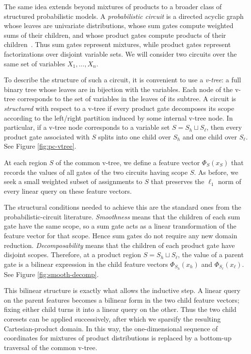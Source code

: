 \documentclass{article}
\begin{document}
The same idea extends beyond mixtures of products to a broader class of
structured probabilistic models.  A \emph{probabilistic circuit} is a
directed acyclic graph whose leaves are univariate distributions, whose
sum gates compute weighted sums of their children, and whose product
gates compute products of their children~\cite{ChoiVergariVanDenBroeck20,ZhangWangArenasVanDenBroeck25}.  
Thus sum gates represent
mixtures, while product gates represent factorizations over disjoint
variable sets.  We will consider two circuits over the same set of
variables $X_1,\ldots,X_n$.

To describe the structure of such a circuit, it is convenient to use a
\emph{v-tree}: a full binary tree whose leaves are in bijection with the
variables.  Each node of the v-tree corresponds to the set of variables
in the leaves of its subtree.  A circuit is \emph{structured} with
respect to a v-tree if every product gate decomposes its scope according
to the left/right partition induced by some internal v-tree node.  In
particular, if a v-tree node corresponds to a variable set
$S=S_h\sqcup S_\ell$, then every product gate associated with $S$
splits into one child over $S_h$ and one child over $S_\ell$. See Figure \ref{fig:pc-vtree}.

At each region $S$ of the common v-tree, we define a feature vector
$\Phi_S(x_S)$ that records the values of all gates of the two circuits
having scope $S$.  
As before, we seek a small weighted subset of
assignments to $S$ that preserves the $\ell_1$ norm of every linear
query on these feature vectors.

The structural conditions needed to achieve this are the standard ones from the probabilistic-circuit literature.  
\emph{Smoothness} means that the
children of each sum gate have the same scope, so a sum gate acts as a
linear transformation of the feature vector for that scope.  Hence sum
gates do not require any new domain reduction.  \emph{Decomposability}
means that the children of each product gate have disjoint scopes.
Therefore, at a product region $S=S_h\sqcup S_\ell$, the value of a
parent gate is a bilinear expression in the child feature vectors
$\Phi_{S_h}(x_h)$ and $\Phi_{S_\ell}(x_\ell)$. See Figure \ref{fig:smooth-decomp}.

This bilinear structure is exactly what allows the inductive step.  A
linear query on the parent features becomes a bilinear form in the two
child feature vectors; fixing either child turns it into a linear query
on the other.  Thus the two child coresets can be applied successively,
after which we sparsify the resulting Cartesian-product domain.  In this
way, the one-dimensional sequence of coordinates for mixtures of product
distributions is replaced by a bottom-up traversal of the common v-tree.
\end{document}
